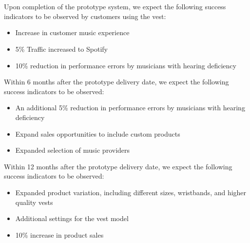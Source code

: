 \\
\\	
Upon completion of the prototype system, we expect the following success indicators to be observed by customers using the vest:
\begin{itemize}
  \item Increase in customer music experience 
  \item 5\% Traffic increased to Spotify 
  \item 10\% reduction in performance errors by musicians with hearing deficiency
\end{itemize}

Within 6 months after the prototype delivery date, we expect the following success indicators to be observed:
\begin{itemize}
  \item An additional 5\% reduction in performance errors by musicians with hearing deficiency
  \item Expand sales opportunities to include custom products
  \item Expanded selection of music providers
\end{itemize}

Within 12 months after the prototype delivery date, we expect the following success indicators to be observed:
\begin{itemize}
  \item Expanded product variation, including different sizes, wristbands, and higher quality vests
  \item Additional settings for the vest model 
  \item 10\% increase in product sales
\end{itemize}


